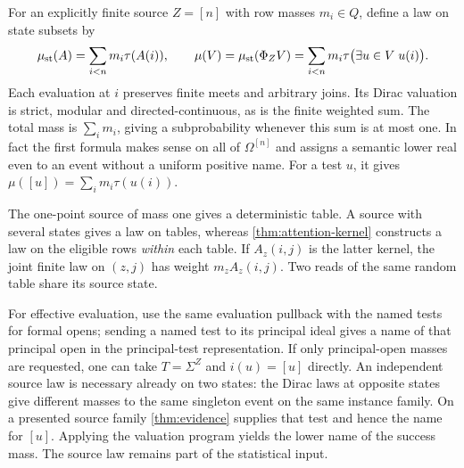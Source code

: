 \documentclass[11pt,a4paper]{article}
\theoremstyle{definition}
\theoremstyle{remark}\newaliascnt{remark}{theorem}
\numberwithin{equation}{section}
\begin{document}
For an explicitly finite source $Z=[n]$ with row masses $m_i\in Q$, define a law on state subsets by
\[
 \mu_{\rm st}(A)=\sum_{i<n}m_i\tau(A(i)),\qquad
 \mu(V)=\mu_{\rm st}(\Phi_Z V)
       =\sum_{i<n}m_i\tau\bigl(\exists u\in V\;u(i)\bigr).
\]
Each evaluation at $i$ preserves finite meets and arbitrary joins. Its Dirac valuation is strict, modular and directed-continuous, as is the finite weighted sum. The total mass is $\sum_i m_i$, giving a subprobability whenever this sum is at most one. In fact the first formula makes sense on all of $\Omega^{[n]}$ and assigns a semantic lower real even to an event without a uniform positive name. For a test $u$, it gives $\mu([u])=\sum_i m_i\tau(u(i))$.

The one-point source of mass one gives a deterministic table. A source with several states gives a law on tables, whereas \cref{thm:attention-kernel} constructs a law on the eligible rows \emph{within} each table. If $A_z(i,j)$ is the latter kernel, the joint finite law on $(z,j)$ has weight $m_zA_z(i,j)$. Two reads of the same random table share its source state.

For effective evaluation, use the same evaluation pullback with the named tests for formal opens; sending a named test to its principal ideal gives a name of that principal open in the principal-test representation. If only principal-open masses are requested, one can take $T=\Sigma^Z$ and $i(u)=[u]$ directly. An independent source law is necessary already on two states: the Dirac laws at opposite states give different masses to the same singleton event on the same instance family. On a presented source family \cref{thm:evidence} supplies that test and hence the name for $[u]$. Applying the valuation program yields the lower name of the success mass. The source law remains part of the statistical input.
\end{document}
